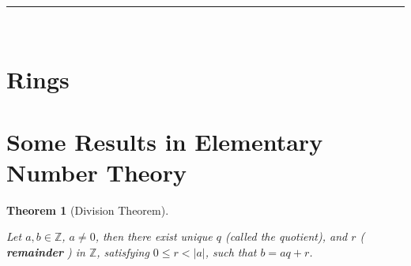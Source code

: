 \documentclass[a4paper,12pt]{report}
\newcommand{\abs}[1]{\left|#1\right|}
\newcounter{statement}
\numberwithin{statement}{chapter}
\newtheorem{thm}[statement]{Theorem}
\numberwithin{equation}{chapter}
\numberwithin{section}{chapter}
\numberwithin{subsection}{section}
\begin{document}
\quad\\\hrule
\quad\\
\section*{Rings}


\section{Some Results in Elementary Number Theory}




\begin{thm}[Division Theorem]

\label{thm:divalg}



Let $a, b \in \mathbb{Z}$, $a \neq 0$,
then there exist unique $q$ (called the quotient), and $r$ ( {\bf remainder} ) in $\mathbb{Z}$, satisfying
$0 \leq r < \abs{a}$, such that $b = aq + r$.
\end{thm}
\end{document}

